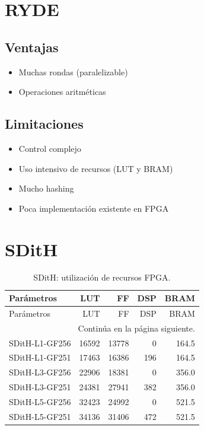 \section{RYDE}

\subsection*{Ventajas}
\begin{itemize}
\item Muchas rondas (paralelizable)
\item Operaciones aritméticas
\end{itemize}

\subsection*{Limitaciones}
\begin{itemize}
\item Control complejo
\item Uso intensivo de recursos (LUT y BRAM)
\item Mucho hashing
\item Poca implementación existente en FPGA
\end{itemize}

\section{SDitH}

\begingroup
\small
\setlength{\tabcolsep}{3pt}
\setlength{\LTcapwidth}{\textwidth}
\begin{longtable}{lrrrr}
\caption{SDitH: utilización de recursos FPGA.}\label{tab:eval-sdith}\\
\toprule
Parámetros & LUT & FF & DSP & BRAM \\
\midrule
\endfirsthead
\toprule
Parámetros & LUT & FF & DSP & BRAM \\
\midrule
\endhead
\midrule
\multicolumn{5}{r}{\small Continúa en la página siguiente.}\\
\endfoot
\bottomrule
\endlastfoot
{SDitH-L1-GF256} & {16592} & {13778} & {0} & {164.5} \\
{SDitH-L1-GF251} & {17463} & {16386} & {196} & {164.5} \\
{SDitH-L3-GF256} & {22906} & {18381} & {0} & {356.0} \\
{SDitH-L3-GF251} & {24381} & {27941} & {382} & {356.0} \\
{SDitH-L5-GF256} & {32423} & {24992} & {0} & {521.5} \\
{SDitH-L5-GF251} & {34136} & {31406} & {472} & {521.5} \\
\end{longtable}
\endgroup


